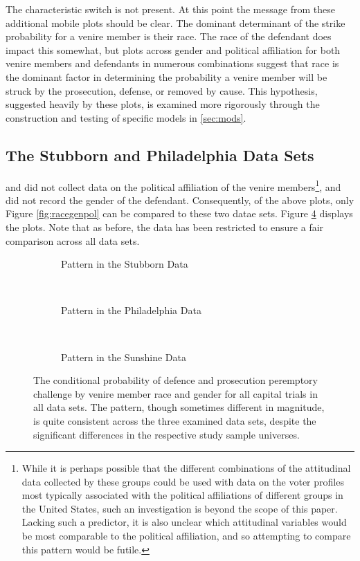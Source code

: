 The characteristic switch is not present. At this point the message from these additional mobile plots should be clear. The
dominant determinant of the strike probability for a venire member is their race. The race of the defendant does impact this
somewhat, but plots across gender and political affiliation for both venire members and defendants in numerous combinations
suggest that race is the dominant factor in determining the probability a venire member will be struck by the prosecution,
defense, or removed by cause. This hypothesis, suggested heavily by these plots, is examined more rigorously through the
construction and testing of specific models in \ref{sec:mods}.

\subsection{The Stubborn and Philadelphia Data Sets}

\cite{StubbornLegacy} and \cite{PerempChalMurder} did not collect data on the political affiliation of the venire
members\footnote{While it is perhaps possible that the different combinations of the attitudinal data collected by these groups
  could be used with data on the voter profiles most typically associated with the political affiliations of different groups in
  the United States, such an investigation is beyond the scope of this paper. Lacking such a predictor, it is also unclear which
  attitudinal variables would be most comparable to the political affiliation, and so attempting to compare this pattern would be
  futile.}, and \cite{StubbornLegacy} did not record the gender of the defendant. Consequently, of the above plots, only Figure
\ref{fig:racegenpol} can be compared to these two datae sets. Figure \ref{fig:genderalldata} displays the plots. Note that as
before, the data has been restricted to ensure a fair comparison across all data sets.

\begin{figure}[h!]
  \centering
  \begin{subfigure}{0.4\textwidth}
    \caption{\footnotesize Pattern in the Stubborn Data}
    \label{fig:stubcompgen}
  \end{subfigure}
  ~
  \begin{subfigure}{0.4\textwidth}
    \caption{\footnotesize Pattern in the Philadelphia Data}
    \label{fig:philcompgen}
  \end{subfigure}
  ~
    \begin{subfigure}{0.4\textwidth}
    \caption{\footnotesize Pattern in the Sunshine Data}
    \label{fig:suncompgen}
  \end{subfigure}
  \caption[Strikes by Race and Gender of Venire Member (All Capital Trial Data)]
  {\footnotesize The conditional probability of defence and prosecution peremptory challenge by venire member race and gender for
    all capital trials in all data sets. The pattern, though sometimes different in magnitude, is quite consistent across the three
    examined data sets, despite the significant differences in the respective study sample universes.}
  \label{fig:genderalldata}
\end{figure}

